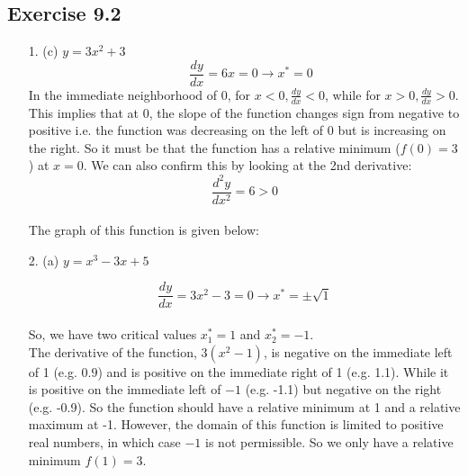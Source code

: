\documentclass{./../../Latex/homework}
\begin{document}
\thispagestyle{plain}

\subsection*{Exercise 9.2} 

\begin{enumerate}
\item[1.] (c) $y=3 x^{2}+3$
$$ \quad \frac{d y}{d x}=6 x=0 \rightarrow x^{*}=0 $$
In the immediate neighborhood of $0$, for $x<0, \frac{d y}{d x}<0$, while for $x>0, \frac{d y}{d x}>0$. This implies that at $0$, the slope of the function changes sign from negative to positive i.e. the function was decreasing on the left of 0 but is increasing on the right. So it must be that the function has a relative minimum ($f(0)=3$) at $x=0$. We can also confirm this by looking at the 2nd derivative: $$\frac{d^{2} y}{d x^{2}}=6>0$$ \\
The graph of this function is given below: \\

\begin{center}
\end{center}

\newpage
\item[2.] 
 (a) $y=x^{3}-3 x+5$

$$\frac{d y}{d x}=3 x^{2}-3=0 \rightarrow x^{*}= \pm \sqrt{1}$$ \\
So, we have two critical values $x_{1}^{*}=1$ and $x_{2}^{*}=-1$. \\

The derivative of the function, $3\left(x^{2}-1\right)$, is negative on the immediate left of 1 (e.g. $0.9$) and is positive on the immediate right of 1 (e.g. 1.1). While it is positive on the immediate left of $-1$ (e.g. -1.1) but negative on the right (e.g. -0.9). So the function should have a relative minimum at 1 and a relative maximum at -1. However, the domain of this function is limited to positive real numbers, in which case $-1$ is not permissible. So we only have a relative minimum $f(1)=3$.  \\


\end{enumerate}
\end{document}
